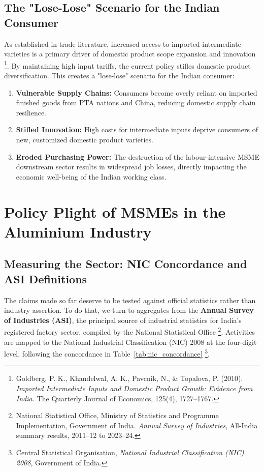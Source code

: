 \documentclass[11pt, a4paper]{article}
\numberwithin{figure}{section}
\numberwithin{table}{section}
\begin{document}
\subsection{The "Lose-Lose" Scenario for the Indian Consumer}
As established in trade literature, increased access to imported intermediate varieties is a primary driver of domestic product scope expansion and innovation \cite{goldberg2010}\footnote{Goldberg, P. K., Khandelwal, A. K., Pavcnik, N., \& Topalova, P. (2010). \textit{Imported Intermediate Inputs and Domestic Product Growth: Evidence from India.} The Quarterly Journal of Economics, 125(4), 1727--1767.}. By maintaining high input tariffs, the current policy stifles domestic product diversification. This creates a "lose-lose" scenario for the Indian consumer:
\begin{enumerate}
    \item \textbf{Vulnerable Supply Chains:} Consumers become overly reliant on imported finished goods from PTA nations and China, reducing domestic supply chain resilience.
    \item \textbf{Stifled Innovation:} High costs for intermediate inputs deprive consumers of new, customized domestic product varieties.
    \item \textbf{Eroded Purchasing Power:} The destruction of the labour-intensive MSME downstream sector results in widespread job losses, directly impacting the economic well-being of the Indian working class.
\end{enumerate}

\section{Policy Plight of MSMEs in the Aluminium Industry}

\subsection{Measuring the Sector: NIC Concordance and ASI Definitions}
\label{sec:asi_method}
The claims made so far deserve to be tested against official statistics rather than industry assertion. To do that, we turn to aggregates from the \textbf{Annual Survey of Industries (ASI)}, the principal source of industrial statistics for India's registered factory sector, compiled by the National Statistical Office \cite{asi2024}\footnote{National Statistical Office, Ministry of Statistics and Programme Implementation, Government of India. \textit{Annual Survey of Industries}, All-India summary results, 2011--12 to 2023--24.}. Activities are mapped to the National Industrial Classification (NIC) 2008 at the four-digit level, following the concordance in Table~\ref{tab:nic_concordance} \cite{nic2008}\footnote{Central Statistical Organisation, \textit{National Industrial Classification (NIC) 2008}, Government of India.}.
\end{document}
